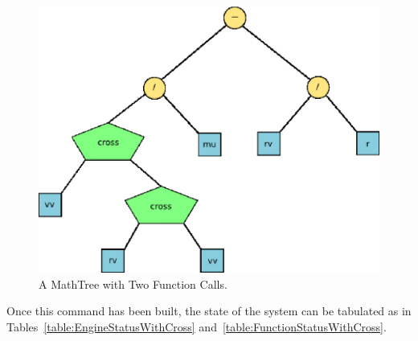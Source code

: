 \begin{figure}[htb]
\begin{center}
\includegraphics[scale=0.5]{Images/CrossMathTree.eps}
\caption{\label{figure:TwoFunMathTree}A MathTree with Two Function Calls.}
\end{center}
\end{figure}

\noindent Once this command has been built, the state of the system can be tabulated as in
Tables~\ref{table:EngineStatusWithCross} and~\ref{table:FunctionStatusWithCross}.

